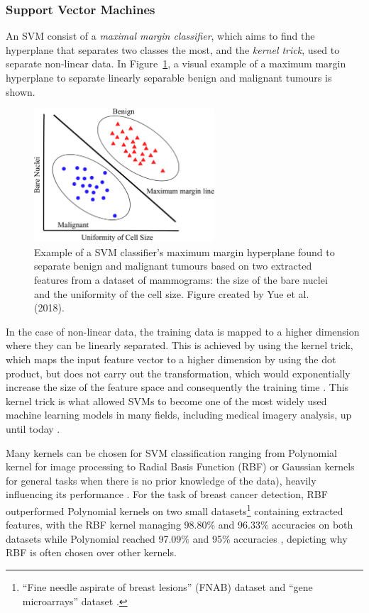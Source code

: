 \subsubsection{Support Vector Machines}
\label{sec:litsurvey-svms}

An SVM consist of a \textit{maximal margin classifier}, which aims to find the hyperplane that separates two classes the most, and the \textit{kernel trick}, used to separate non-linear data. In Figure~\ref{fig:litsurvey-svm-example}, a visual example of a maximum margin hyperplane to separate linearly separable benign and malignant tumours is shown.\\

\begin{figure}[ht]
\centerline{\includegraphics[width=0.6\textwidth]{figures/litsurvey/svm.png}}
\caption{\label{fig:litsurvey-svm-example}Example of a SVM classifier's maximum margin hyperplane found to separate benign and malignant tumours based on two extracted features from a dataset of mammograms: the size of the bare nuclei and the uniformity of the cell size. Figure created by Yue et al. (2018).}
\end{figure}

In the case of non-linear data, the training data is mapped to a higher dimension where they can be linearly separated. This is achieved by using the kernel trick, which maps the input feature vector to a higher dimension by using the dot product, but does not carry out the transformation, which would exponentially increase the size of the feature space and consequently the training time \citep{Geron2019}. This kernel trick is what allowed SVMs to become one of the most widely used machine learning models in many fields, including medical imagery analysis, up until today \citep{Yue2018}.

Many kernels can be chosen for SVM classification ranging from Polynomial kernel for image processing to Radial Basis Function (RBF) or Gaussian kernels for general tasks when there is no prior knowledge of the data), heavily influencing its performance \citep{amari1999improving}. For the task of breast cancer detection, RBF outperformed Polynomial kernels on two small datasets\footnote{``Fine needle aspirate of breast lesions'' (FNAB) dataset and ``gene microarrays'' dataset \citep{Osareh2010}.} containing extracted features, with the RBF kernel managing 98.80\% and 96.33\% accuracies on both datasets while Polynomial reached 97.09\% and 95\% accuracies \citep{Osareh2010}, depicting why RBF is often chosen over other kernels.\\


